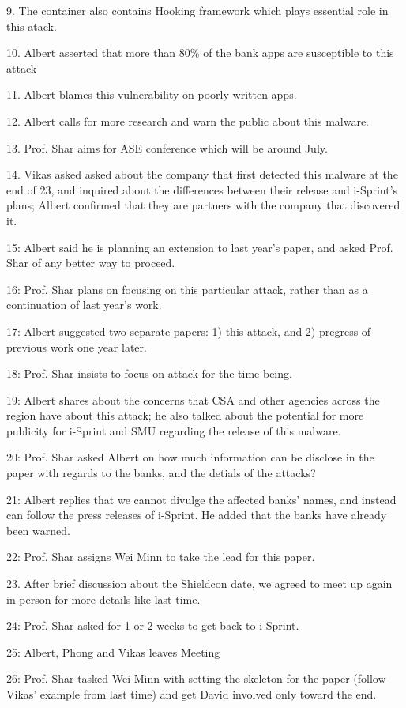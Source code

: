 9. The container also contains Hooking framework which plays essential role in this atack.

10. Albert asserted that more than 80\% of the bank apps are susceptible to this attack

11. Albert blames this vulnerability on poorly written apps.

12. Albert calls for more research and warn the public about this malware.

13. Prof. Shar aims for ASE conference which will be around July.

14. Vikas asked asked about the company that first detected this malware at the end of 23, and inquired about the differences between their release and i-Sprint's plans; Albert confirmed that they are partners with the company that discovered it.

15: Albert said he is planning an extension to last year's paper, and asked Prof. Shar of any better way to proceed.

16: Prof. Shar plans on focusing on this particular attack, rather than as a continuation of last year's work.

17: Albert suggested two separate papers: 1) this attack, and 2) pregress of previous work one year later.

18: Prof. Shar insists to focus on attack for the time being.

19: Albert shares about the concerns that CSA and other agencies across the region have about this attack; he also talked about the potential for more publicity for i-Sprint and SMU regarding the release of this malware.

20: Prof. Shar asked Albert on how much information can be disclose in the paper with regards to the banks, and the detials of the attacks?

21: Albert replies that we cannot divulge the affected banks' names, and instead can follow the press releases of i-Sprint. He added that the banks have already been warned.

22: Prof. Shar assigns Wei Minn to take the lead for this paper.

23. After brief discussion about the Shieldcon date, we agreed to meet up again in person for more details like last time.

24: Prof. Shar asked for 1 or 2 weeks to get back to i-Sprint.

25: Albert, Phong and Vikas leaves Meeting

26: Prof. Shar tasked Wei Minn with setting the skeleton for the paper (follow Vikas' example from last time) and get David involved only toward the end.
